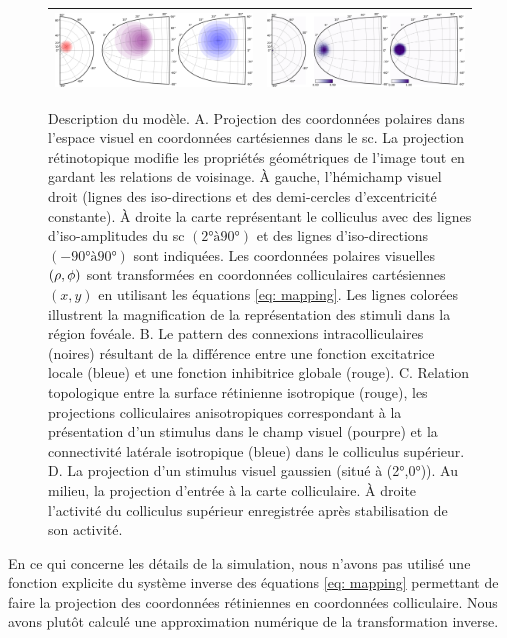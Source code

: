 \begin{figure}
\begin{tabular}{|c|c|}
\includegraphics[width=.5\textwidth]{figures/ch3_4_topology}& \includegraphics[width=.5\textwidth]{figures/ch3_4_stimulus-1}\\
\hline
\end{tabular}
  \caption{
Description du modèle. A. Projection des coordonnées polaires dans l'espace visuel en coordonnées cartésiennes dans le \protect\gls{sc}. La projection rétinotopique modifie les propriétés géométriques de l'image tout en gardant les relations de voisinage. \protect\`A gauche, l'hémichamp visuel droit (lignes des iso-directions et des demi-cercles d'excentricité constante). \protect\`A droite la carte représentant le colliculus avec des lignes d'iso-amplitudes du \protect\gls{sc} $(2° à 90°)$ et des lignes d'iso-directions $(- 90° à 90°)$ sont indiquées. Les coordonnées polaires visuelles $(\protect\rho, \protect\phi)$ sont transformées en coordonnées colliculaires cartésiennes $(x, y)$ en utilisant les équations \protect\ref{eq: mapping}. Les lignes colorées illustrent la magnification de la représentation des stimuli dans la région fovéale. B. Le pattern des connexions intracolliculaires (noires) résultant de la différence entre une fonction excitatrice locale (bleue) et une fonction inhibitrice globale (rouge). C. Relation topologique entre la surface rétinienne isotropique (rouge), les projections colliculaires anisotropiques correspondant à la présentation d'un stimulus dans le champ visuel (pourpre) et la connectivité latérale isotropique (bleue) dans le colliculus supérieur. D. La projection d'un stimulus visuel gaussien (situé à (2°,0°)). Au milieu, la projection d'entrée à la carte colliculaire. \protect\`A droite l'activité du colliculus supérieur enregistrée après stabilisation de son activité.
}
  \label{fig: mapping}
\end{figure}

En ce qui concerne les détails de la simulation, nous n'avons pas utilisé une fonction explicite du système inverse des équations \ref{eq: mapping} permettant de faire la projection des coordonnées rétiniennes en coordonnées colliculaire. Nous avons plutôt calculé une approximation numérique de la transformation inverse.

